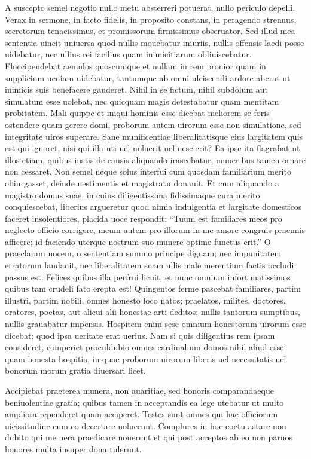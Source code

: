 \documentclass[a5paper,twoside]{article}
\begin{document}
A suscepto semel negotio nullo metu absterreri potuerat, nullo periculo depelli. Verax in sermone, in facto fidelis, in proposito constans, in peragendo strenuus, secretorum tenacissimus, et promissorum firmissimus obseruator. Sed illud mea sententia uincit uniuersa quod nullis mouebatur iniuriis, nullis offensis laedi posse uidebatur, nec ullius rei facilius quam inimicitiarum obliuiscebatur. Floccipendebat aemulos quoscumque et nullam in rem pronior quam in supplicium ueniam uidebatur, tantumque ab omni ulciscendi ardore aberat ut inimicis suis benefacere gauderet. Nihil in se fictum, nihil subdolum aut simulatum esse uolebat, nec quicquam magis detestabatur quam mentitam probitatem. Mali quippe et iniqui hominis esse dicebat meliorem se foris ostendere quam gerere domi, proborum autem uirorum esse non simulatione, sed integritate uiros superare. Sane munificentiae liberalitatisque eius largitatem quis est qui ignoret, nisi qui illa uti uel noluerit uel nescierit? Ea ipse ita flagrabat ut illos etiam, quibus iustis de causis aliquando irascebatur, muneribus tamen ornare non cessaret. Non semel neque solus interfui cum quosdam familiarium merito obiurgasset, deinde uestimentis et magistratu donauit. Et cum aliquando a magistro domus suae, in cuius diligentissima fidissimaque cura merito conquiescebat, liberius argueretur quod nimia indulgentia et largitate domesticos faceret insolentiores, placida uoce respondit: ``Tuum est familiares meos pro neglecto officio corrigere, meum autem pro illorum in me amore congruis praemiis afficere; id faciendo uterque nostrum suo munere optime functus erit.'' O praeclaram uocem, o sententiam summo principe dignam; nec impunitatem erratorum laudauit, nec liberalitatem suam ullis male merentium factis occludi passus est. Felices quibus illa perfrui licuit, et nunc omnium infortunatissimos quibus tam crudeli fato erepta est! Quingentos ferme pascebat familiares, partim illustri, partim nobili, omnes honesto loco natos; praelatos, milites, doctores, oratores, poetas, aut alicui alii honestae arti deditos; nullis tantorum sumptibus, nullis grauabatur impensis. Hospitem enim sese omnium honestorum uirorum esse dicebat; quod ipsa ueritate erat uerius. Nam si quis diligentius rem ipsam consideret, comperiet proculdubio omnes cardinalium domos nihil aliud esse quam honesta hospitia, in quae proborum uirorum liberis uel necessitatis uel bonorum morum gratia diuersari licet.

Accipiebat praeterea munera, non auaritiae, sed honoris comparandaeque beniuolentiae gratia; quibus tamen in acceptandis ea lege utebatur ut multo ampliora rependeret quam acciperet. Testes sunt omnes qui hac officiorum uicissitudine cum eo decertare uoluerunt. Complures in hoc coetu astare non dubito qui me uera praedicare nouerunt et qui post acceptos ab eo non paruos honores multa insuper dona tulerunt.
\end{document}
